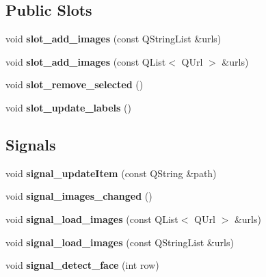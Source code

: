\subsection*{Public Slots}
\begin{DoxyCompactItemize}
\item 
\mbox{\label{classFWorkingWidget_ada5c7a339541c0539af7b8c7404a4d1b}} 
void {\bfseries slot\+\_\+add\+\_\+images} (const Q\+String\+List \&urls)
\item 
\mbox{\label{classFWorkingWidget_abb592c30f0c97ecd92f82e98c0aa5328}} 
void {\bfseries slot\+\_\+add\+\_\+images} (const Q\+List$<$ Q\+Url $>$ \&urls)
\item 
\mbox{\label{classFWorkingWidget_a38c51fab9a4148a4250721973edd3f76}} 
void {\bfseries slot\+\_\+remove\+\_\+selected} ()
\item 
\mbox{\label{classFWorkingWidget_a0b16dfaa4c53c5d92d0df10271784d2e}} 
void {\bfseries slot\+\_\+update\+\_\+labels} ()
\end{DoxyCompactItemize}
\subsection*{Signals}
\begin{DoxyCompactItemize}
\item 
\mbox{\label{classFWorkingWidget_ac38f7d72616fcf31139f68f960cc67bc}} 
void {\bfseries signal\+\_\+update\+Item} (const Q\+String \&path)
\item 
\mbox{\label{classFWorkingWidget_a84f5aa0893ce0ee469dfafa7760c2342}} 
void {\bfseries signal\+\_\+images\+\_\+changed} ()
\item 
\mbox{\label{classFWorkingWidget_a1a422682a4089845e7bbd2b8a44ba17d}} 
void {\bfseries signal\+\_\+load\+\_\+images} (const Q\+List$<$ Q\+Url $>$ \&urls)
\item 
\mbox{\label{classFWorkingWidget_ae501f074b45a1c9d98a827e1c92de889}} 
void {\bfseries signal\+\_\+load\+\_\+images} (const Q\+String\+List \&urls)
\item 
\mbox{\label{classFWorkingWidget_a249999260ac8e05d3eb0c3af10905566}} 
void {\bfseries signal\+\_\+detect\+\_\+face} (int row)
\end{DoxyCompactItemize}
